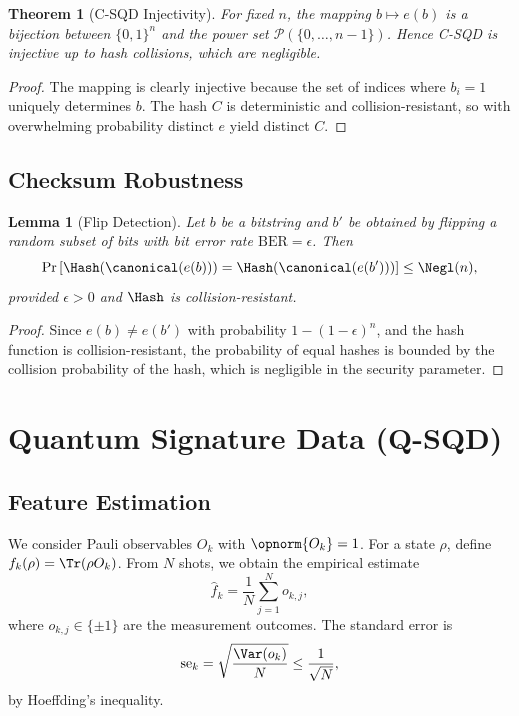 \documentclass[11pt,a4paper]{article}
\newtheorem{theorem}{Theorem}
\newtheorem{lemma}{Lemma}
\theoremstyle{plain}
\begin{document}
\begin{theorem}[C-SQD Injectivity]
For fixed $n$, the mapping $b \mapsto e(b)$ is a bijection between $\{0,1\}^n$ and the power set $\mathcal{P}(\{0,\dots,n-1\})$. Hence C-SQD is injective up to hash collisions, which are negligible.
\end{theorem}

\begin{proof}
The mapping is clearly injective because the set of indices where $b_i=1$ uniquely determines $b$. The hash $C$ is deterministic and collision-resistant, so with overwhelming probability distinct $e$ yield distinct $C$.
\end{proof}

\subsection{Checksum Robustness}

\begin{lemma}[Flip Detection]
Let $b$ be a bitstring and $b'$ be obtained by flipping a random subset of bits with bit error rate $\mathrm{BER} = \epsilon$. Then
\[
\Pr\left[\Hash(\canonical(e(b))) = \Hash(\canonical(e(b')))\right] \leq \Negl(n),
\]
provided $\epsilon > 0$ and $\Hash$ is collision-resistant.
\end{lemma}

\begin{proof}
Since $e(b) \neq e(b')$ with probability $1 - (1-\epsilon)^n$, and the hash function is collision-resistant, the probability of equal hashes is bounded by the collision probability of the hash, which is negligible in the security parameter.
\end{proof}

\section{Quantum Signature Data (Q-SQD)}

\subsection{Feature Estimation}

We consider Pauli observables $O_k$ with $\opnorm{O_k}=1$. For a state $\rho$, define $f_k(\rho) = \Tr(\rho O_k)$. From $N$ shots, we obtain the empirical estimate
\[
\hat{f}_k = \frac{1}{N} \sum_{j=1}^N o_{k,j},
\]
where $o_{k,j} \in \{\pm 1\}$ are the measurement outcomes. The standard error is
\[
\mathrm{se}_k = \sqrt{\frac{\Var(o_k)}{N}} \leq \frac{1}{\sqrt{N}},
\]
by Hoeffding's inequality.
\end{document}
